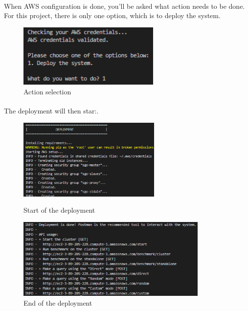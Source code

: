 \paragraph{}When AWS configuration is done, you'll be asked what action needs to be done. For this project, there is only one option, which is to deploy the system.

\begin{figure}[htbp]
  \centering
  \includegraphics[width=7cm]{Resources/script_2.png}
  \caption{Action selection}
\end{figure}

\paragraph{}The deployment will then star:.

\begin{figure}[htbp]
  \centering
  \begin{minipage}[b]{0.44\textwidth}
    \includegraphics[height=4cm]{Resources/script_3.png}
    \caption{Start of the deployment}
  \end{minipage}
  \hfill
  \begin{minipage}[b]{0.54\textwidth}
    \includegraphics[height=4cm]{Resources/script_4.png}
    \caption{End of the deployment}
  \end{minipage}
\end{figure}\\

